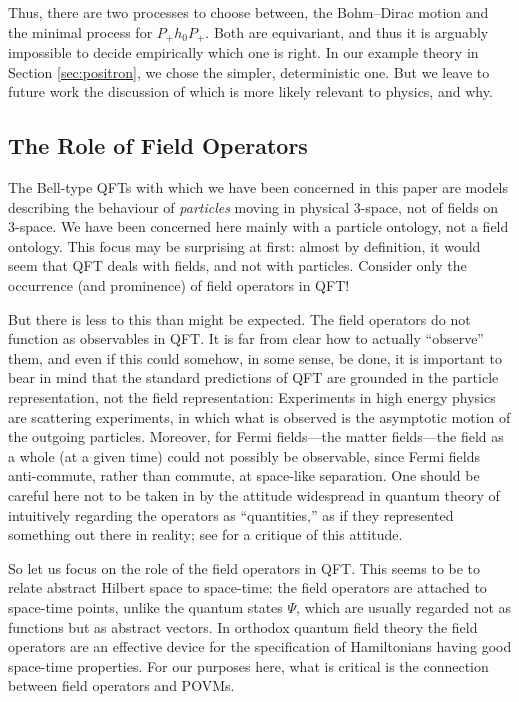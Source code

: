 \documentclass[12pt]{article}
\newcommand{\1}{\mathbf{1}} %
\begin{document}
Thus, there are two processes to choose between, the Bohm--Dirac
motion and the minimal process for $P_+ h_0 P_+$. Both are
equivariant, and thus it is arguably impossible to decide empirically
which one is right.  In our example theory in Section
\ref{sec:positron}, we chose the simpler, deterministic one. But we
leave to future work the discussion of which is more likely relevant
to physics, and why.





\subsection{The Role of Field Operators}\label{sec:fields}

The Bell-type QFTs with which we have been concerned in this paper are
models describing the behaviour of \emph{particles} moving in physical
3-space, not of fields on 3-space. We have been concerned here mainly
with a particle ontology, not a field ontology. This focus may be
surprising at first: almost by definition, it would seem that QFT
deals with fields, and not with particles.  Consider only the
occurrence (and prominence) of field operators in QFT!

But there is less to this than might be expected.  The field operators
do not function as observables in QFT. It is far from clear how to
actually ``observe'' them, and even if this could somehow, in some
sense, be done, it is important to bear in mind that the standard
predictions of QFT are grounded in the particle representation, not
the field representation: Experiments in high energy physics are
scattering experiments, in which what is observed is the asymptotic
motion of the outgoing particles.  Moreover, for Fermi fields---the
matter fields---the field as a whole (at a given time) could not
possibly be observable, since Fermi fields anti-commute, rather than
commute, at space-like separation. One should be careful here
not to be taken in by the attitude widespread in quantum theory
of intuitively regarding the operators as ``quantities,'' as if they
represented something out there in reality; see \cite{naive} for a
critique of this attitude.

So let us focus on the role of the field operators in QFT.  This seems
to be to relate abstract Hilbert space to space-time: the field
operators are attached to space-time points, unlike the quantum states
$\Psi$, which are usually regarded not as functions but as abstract
vectors. In orthodox quantum field theory the field operators are an
effective device for the specification of Hamiltonians having good
space-time properties. For our purposes here, what is critical is the
connection between field operators and POVMs.
\end{document}

